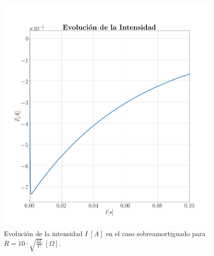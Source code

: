\documentclass[journal]{IEEEtran}
\begin{document}
\begin{figure}[!htb]
    \centering
    \includegraphics[width=\linewidth,trim={40 70 70 70},clip]{intensidadsobreamortiguado.png}
    \caption{Evolución de la intensidad $I~[A]$ en el caso sobreamortiguado para $R=10 \cdot\sqrt{\frac{4L}{C}}~[\Omega]$.}
    \label{fig:intensidadsobreamortiguado}
\end{figure}
\end{document}
